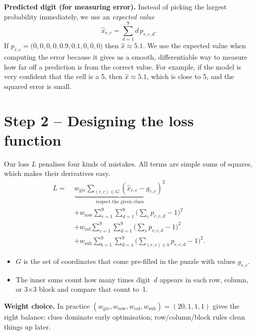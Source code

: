 \documentclass[12pt]{article}
\begin{document}
\textbf{Predicted digit (for measuring error).}
Instead of picking the largest probability immediately, we use an \emph{expected value}
\begin{equation}
    \hat x_{r,c} = \sum_{d=1}^{9}d\,p_{r,c,d}.
\end{equation}
If $p_{r,c}=\bigl(0,0,0,0,0.9,0.1,0,0,0\bigr)$ then $\hat x\approx5.1$. We use the expected value when computing the error because it gives us a smooth, differentiable way to measure how far off a prediction is from the correct value.
For example, if the model is very confident that the cell is a 5, then $\hat{x} \approx 5.1$, which is close to 5, and the squared error is small.


\section{Step 2 -- Designing the loss function}

Our loss $L$ penalises four kinds of mistakes. All terms are simple sums of squares,
which makes their derivatives easy.
\begin{align*}
    L = \;&\underbrace{w_{\text{giv}}\sum_{(r,c)\in G}(\hat x_{r,c}-g_{r,c})^{2}}_{\text{respect the given clues}} \\
    &+ w_{\text{row}}\sum_{r=1}^{9}\sum_{d=1}^{9}\bigl(\textstyle\sum_c p_{r,c,d}-1\bigr)^{2} \\
    &+ w_{\text{col}}\sum_{c=1}^{9}\sum_{d=1}^{9}\bigl(\textstyle\sum_r p_{r,c,d}-1\bigr)^{2} \\
    &+ w_{\text{sub}}\sum_{b=1}^{9}\sum_{d=1}^{9}\bigl(\textstyle\sum_{(r,c)\in b} p_{r,c,d}-1\bigr)^{2}.
\end{align*}

\begin{itemize}
    \item $G$ is the set of coordinates that come pre-filled in the puzzle with values $g_{r,c}$.
    \item The inner sums count how many times digit~$d$ appears in each row, column, or
          3$\times$3 block and compare that count to~1.
\end{itemize}

\medskip
\noindent\textbf{Weight choice.} In practice $(w_{\text{giv}}, w_{\text{row}}, w_{\text{col}}, w_{\text{sub}}) = (20, 1, 1, 1)$ gives the right balance: 
clues dominate early optimisation; row/column/block rules clean things up later.
\end{document}
